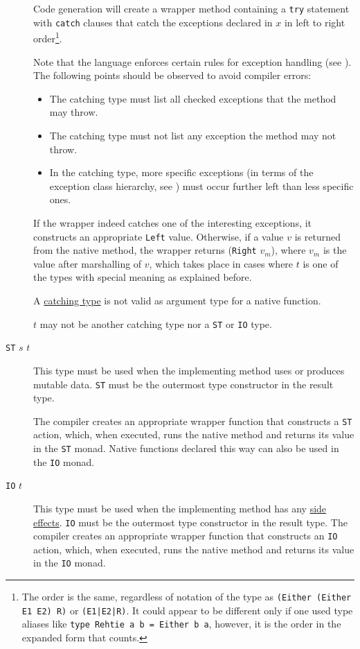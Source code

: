 \begin{description}
Code generation  will create a wrapper method containing a \texttt{try} statement with \texttt{catch} clauses
that catch the exceptions declared in $x$ in left to right order\footnote{
The order is the same, regardless of notation of the type as \texttt{(Either (Either E1 E2) R)} or \texttt{(E1|E2|R)}.
It could appear to be different only if one used type aliases like \texttt{type Rehtie a b = Either b a}, 
however, it is the order in the expanded form that counts.}.

Note that the \java{} language enforces certain rules for exception handling (see \cite[§11]{langspec3}). The following points should be observed to avoid \java{} compiler errors:

\begin{itemize}
\item The catching type must list all checked exceptions that the method may throw.
\item The catching type must not list any exception the method may not throw.
\item In the catching type, more specific exceptions (in terms of the \java{} exception class hierarchy, see \cite[§11.5]{langspec3})
must occur further left than less specific ones. 
\end{itemize}

If the wrapper indeed catches one of the interesting exceptions, it constructs an appropriate \texttt{Left} value.
Otherwise, if a value $v$ is returned from the native method, the wrapper returns (\texttt{Right} $v_m$), 
where $v_m$ is the value after marshalling of $v$, 
which takes place in cases where $t$ is one of the types with special meaning as explained before.

A \hyperref[catching]{catching type} is not valid as argument type for a native function. 

$t$ may not be another catching type nor a \texttt{ST} or \texttt{IO} type.

\item[\texttt{ST} $s$ $t$] This type must be used when the implementing method uses or produces mutable data. 
\texttt{ST} must be the outermost type constructor in the result type. 

The compiler creates an appropriate wrapper function that constructs a \texttt{ST}  action, which, when executed, runs the native method and returns its value in the \texttt{ST} monad. Native functions declared this way can also be used in the \texttt{IO} monad.

\item[\texttt{IO} $t$] This type must be used when the implementing method has any \hyperref[pure]{side effects}. \texttt{IO} must be the outermost type constructor in the result type. 
The compiler creates an appropriate wrapper function that constructs an \texttt{IO}  action, which, when executed, runs the native method and returns its value in the \texttt{IO} monad.

\end{description}


